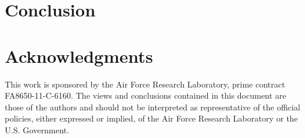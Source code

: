 \documentclass[]{article}
\begin{document}
\section{Conclusion}



 \section*{Acknowledgments}
This work is sponsored by the Air Force Research Laboratory, prime contract FA8650-11-C-6160.  The views and conclusions contained in this document are those of the authors and should not be interpreted as representative of the official policies, either expressed or implied, of the Air Force Research Laboratory or the U.S. Government.



\end{document}
